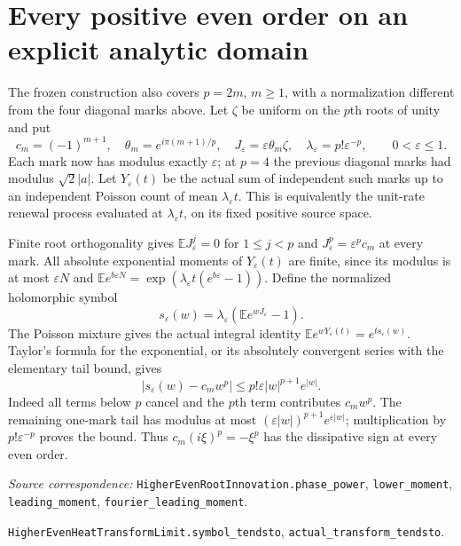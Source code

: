 \documentclass[11pt]{article}
\newcommand{\E}{\mathbb E}\newcommand{\Pp}{\mathbb P}
\newcommand{\code}[1]{{\small\nolinkurl{#1}}}
\begin{document}
\section{Every positive even order on an explicit analytic domain}
The frozen construction also covers $p=2m$, $m\geq1$, with a
normalization different from the four diagonal marks above.
Let $\zeta$ be uniform on the $p$th roots of unity and put
\[
 c_m=(-1)^{m+1},\quad \theta_m=e^{i\pi(m+1)/p},\quad
 J_\varepsilon=\varepsilon\theta_m\zeta,\quad
 \lambda_\varepsilon=p!\varepsilon^{-p},\qquad0<\varepsilon\leq1.
\]
Each mark now has modulus exactly $\varepsilon$; at $p=4$ the
previous diagonal marks had modulus $\sqrt2|a|$. Let
$Y_\varepsilon(t)$ be the actual sum of independent such marks up
to an independent Poisson count of mean $\lambda_\varepsilon t$.
This is equivalently the unit-rate renewal process evaluated at
$\lambda_\varepsilon t$, on its fixed positive source space.

Finite root orthogonality gives
$\E J_\varepsilon^j=0$ for $1\leq j<p$ and
$J_\varepsilon^p=\varepsilon^p c_m$ at every mark.
All absolute exponential moments of $Y_\varepsilon(t)$ are finite,
since its modulus is at most $\varepsilon N$ and
$\E e^{b\varepsilon N}=\exp(\lambda_\varepsilon t(e^{b\varepsilon}-1))$.
Define the normalized holomorphic symbol
\[
 s_\varepsilon(w)=\lambda_\varepsilon
                        (\E e^{wJ_\varepsilon}-1).
\]
The Poisson mixture gives the actual integral identity
$\E e^{wY_\varepsilon(t)}=e^{t s_\varepsilon(w)}$.
Taylor's formula for the exponential, or its absolutely convergent
series with the elementary tail bound, gives
\begin{equation}\label{eq:alleventaylor}
 |s_\varepsilon(w)-c_mw^p|
       \leq p!\varepsilon |w|^{p+1}e^{|w|}.
\end{equation}
Indeed all terms below $p$ cancel and the $p$th term contributes
$c_mw^p$. The remaining one-mark tail has modulus at most
$(\varepsilon|w|)^{p+1}e^{\varepsilon|w|}$; multiplication by
$p!\varepsilon^{-p}$ proves the bound. Thus
$c_m(i\xi)^p=-\xi^p$ has the dissipative sign at every even order.
\par\smallskip\begingroup\small\raggedright
\noindent\textit{Source correspondence:}
\code{HigherEvenRootInnovation.phase_power}, \code{lower_moment},
\code{leading_moment}, \code{fourier_leading_moment}.\par\noindent
\code{HigherEvenHeatTransformLimit.symbol_tendsto},
\code{actual_transform_tendsto}.\par\endgroup
\end{document}
